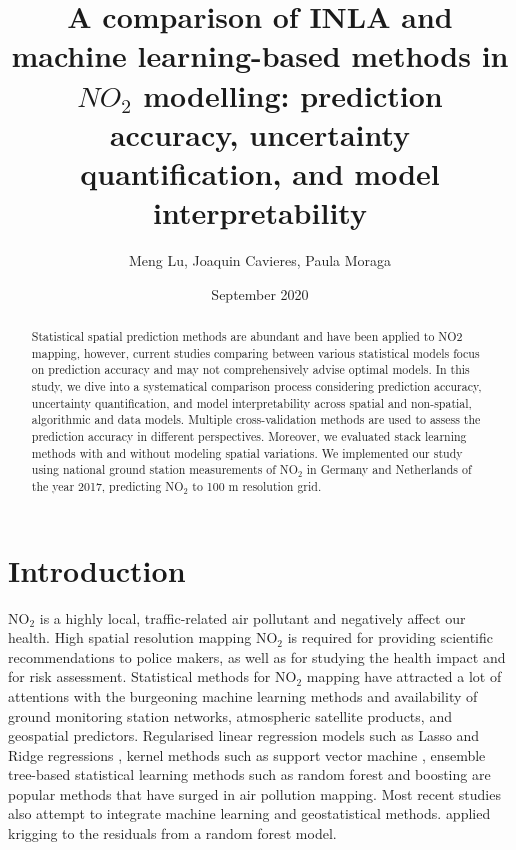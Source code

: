 \documentclass{article}
\author{Meng Lu, Joaquin Cavieres, Paula Moraga }
\date{September 2020}
\title{A comparison of INLA and machine learning-based methods in $NO_2$ modelling: prediction accuracy, uncertainty quantification, and model interpretability }
\begin{document}
\maketitle
\begin{abstract} 
Statistical spatial prediction methods are abundant and have been applied to NO2 mapping, however, current studies comparing between various statistical models focus on prediction accuracy and may not comprehensively advise optimal models. In this study, we dive into a  systematical comparison process considering prediction accuracy, uncertainty quantification, and model interpretability across spatial and non-spatial, algorithmic and data models. Multiple cross-validation methods are used to assess the prediction accuracy in different perspectives. Moreover, we evaluated stack learning methods with and without modeling spatial variations. We implemented our study using national ground station measurements of NO$_2$ in Germany and Netherlands of the year 2017, predicting NO$_2$ to 100 m resolution grid.   
\end{abstract}

\section{Introduction}
NO$_2$ is a highly local, traffic-related air pollutant and negatively affect our health. High spatial resolution mapping NO$_2$ is required for providing scientific recommendations to police makers, as well as for studying the health impact and for risk assessment. Statistical methods for NO$_2$ mapping have attracted a lot of attentions with the burgeoning machine learning methods and availability of ground monitoring station networks, atmospheric satellite products, and geospatial predictors. Regularised linear regression models such as Lasso and Ridge regressions \citep{James2013introduction}, kernel methods such as support vector machine \citep{svm1999least}, ensemble tree-based statistical learning methods such as random forest \citep{breiman2001random} and boosting \citep{chen2016xgboost} are popular methods that have surged in air pollution mapping.
Most recent studies also attempt to integrate machine learning and geostatistical methods. \cite{liu2020integrate} applied krigging to the residuals from a random forest model.
\end{document}
